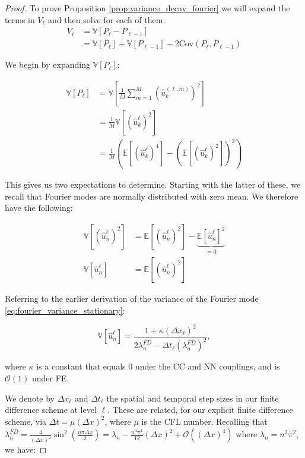 \begin{proof}
    To prove Proposition \ref{prop:variance_decay_fourier} we will expand the terms in
    $V_\ell$ and then 
    solve for each of them.
    \begin{align*}
    V_\ell &= \mathbb{V}[P_\ell - P_{\ell - 1}]\\
    &= \mathbb{V}[P_\ell] + 
        \mathbb{V}[P_{\ell-1}] - 
        2 \mathrm{Cov}\left(P_\ell, P_{\ell - 1}\right)
    \end{align*}

    We begin by expanding $\mathbb{V}[P_\ell]$:

    \begin{align*}
        \mathbb{V}[P_\ell] &= 
        \mathbb{V}\left[\frac{1}{M}\sum_{m=1}^M
        \left(\hat{u}_k^{(\ell, m)}\right)^2\right] \\
        &= \frac{1}{M}\mathbb{V}\left[ (\hat{u}_k^\ell)^2 \right]\\
        &= \frac{1}{M}\left(\mathbb{E}[(\hat{u}_k^\ell)^4] 
        - \left(\mathbb{E}[(\hat{u}_k^\ell)^2]\right)^2\right)
    \end{align*}

    This gives us two expectations to determine. 
    Starting with the latter of these, we recall that 
    Fourier modes are normally distributed with 
    zero mean.
    We therefore have the following:

    \begin{align*}
        \mathbb{V}[(\hat{u}_n^\ell)^2] &= 
        \mathbb{E}[(\hat{u}_n^\ell)^2] - 
        \underbrace{\mathbb{E}[\hat{u}_n^\ell]^2}_{=0}\\
        \mathbb{V}[\hat{u}_n^\ell] &= \mathbb{E}[(\hat{u}_n^\ell)^2]
    \end{align*}

    Referring to the earlier derivation of the variance 
    of the Fourier mode \eqref{eq:fourier_variance_stationary}:
    
    \begin{equation}\label{eq:fourier_mode_var}
        \mathbb{V}[\hat{u}_n^\ell] = 
        \frac{1 + \kappa(\Delta x_\ell)^2}{2 \lambda_n^{FD} - \Delta t_\ell (\lambda_n^{FD})^2},
    \end{equation}

    where $\kappa$ is a constant that equals 0 under the CC and NN couplings, 
    and is $\mathcal{O}(1)$ under FE.
    
    We denote by $\Delta x_\ell$ and $\Delta t_\ell$ the spatial
    and temporal step sizes in our finite difference scheme at level 
    $\ell$.
    These are related, for our explicit finite difference scheme,
    via $\Delta t = \mu (\Delta x)^2$, where $\mu$ is the CFL
    number. Recalling that $\lambda_n^{FD} = \frac{4}{(\Delta x)^2} 
    \sin^2\left(\frac{n \pi \Delta x}{2}\right) = \lambda_n - 
    \frac{n^4 \pi^4}{12}(\Delta x)^2 + \mathcal{O}((\Delta x)^4)$
    where $\lambda_n = n^2 \pi^2$, we have:


\end{proof}
